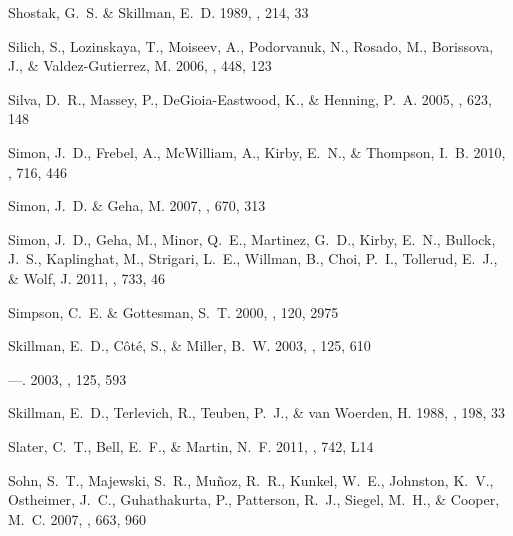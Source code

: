 \documentclass[manuscript]{aastex}
\begin{document}
\begin{thebibliography}{381}
{Shostak}, G.~S. \& {Skillman}, E.~D. 1989, \aap, 214, 33

{Silich}, S., {Lozinskaya}, T., {Moiseev}, A., {Podorvanuk}, N., {Rosado}, M.,
  {Borissova}, J., \& {Valdez-Gutierrez}, M. 2006, \aap, 448, 123

{Silva}, D.~R., {Massey}, P., {DeGioia-Eastwood}, K., \& {Henning}, P.~A. 2005,
  \apj, 623, 148

{Simon}, J.~D., {Frebel}, A., {McWilliam}, A., {Kirby}, E.~N., \& {Thompson},
  I.~B. 2010, \apj, 716, 446

{Simon}, J.~D. \& {Geha}, M. 2007, \apj, 670, 313

{Simon}, J.~D., {Geha}, M., {Minor}, Q.~E., {Martinez}, G.~D., {Kirby}, E.~N.,
  {Bullock}, J.~S., {Kaplinghat}, M., {Strigari}, L.~E., {Willman}, B., {Choi},
  P.~I., {Tollerud}, E.~J., \& {Wolf}, J. 2011, \apj, 733, 46

{Simpson}, C.~E. \& {Gottesman}, S.~T. 2000, \aj, 120, 2975

{Skillman}, E.~D., {C{\^o}t{\'e}}, S., \& {Miller}, B.~W. 2003{},
  \aj, 125, 610

---. 2003{}, \aj, 125, 593

{Skillman}, E.~D., {Terlevich}, R., {Teuben}, P.~J., \& {van Woerden}, H. 1988,
  \aap, 198, 33

{Slater}, C.~T., {Bell}, E.~F., \& {Martin}, N.~F. 2011, \apjl, 742, L14

{Sohn}, S.~T., {Majewski}, S.~R., {Mu{\~n}oz}, R.~R., {Kunkel}, W.~E.,
  {Johnston}, K.~V., {Ostheimer}, J.~C., {Guhathakurta}, P., {Patterson},
  R.~J., {Siegel}, M.~H., \& {Cooper}, M.~C. 2007, \apj, 663, 960


\end{thebibliography}
\end{document}
